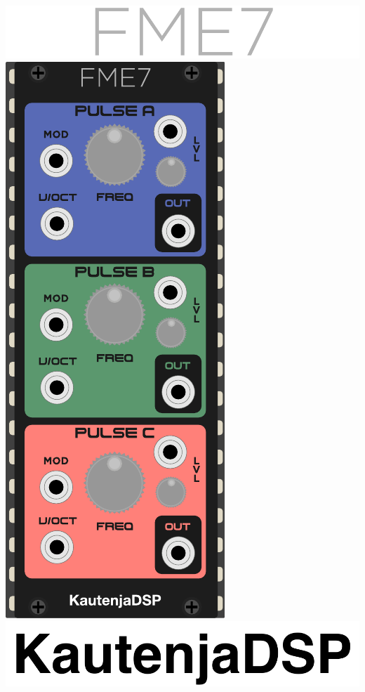 \documentclass[12pt,a4paper]{article}
\begin{document}

\thispagestyle{empty}
\vspace*{\fill}
\begin{center}
\includegraphics{FME7-Logo}
\linebreak\linebreak\linebreak\linebreak
\includegraphics{FME7-Module}
\linebreak\linebreak\linebreak\linebreak
\includegraphics{KautenjaDSP}
\end{center}
\vspace*{\fill}
\clearpage
\end{document}
